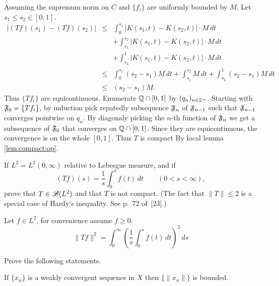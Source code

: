 \begin{enumerate}
\begin{itemize}
Assuming the supremum norm on $C$
and \(\{f_i\}\) are uniformly bounded by $M$.
Let \(s_1 \leq s_2 \in [0,1]\).
\begin{eqnarray*}
\left|(Tf)(s_1) - (Tf)(s_2)\right|
 &\leq& \int_0^{s_1}\left|K(s_1,t) - K(s_2,t)\right|\cdot M\,dt \\
 &    & + \int_{s_1}^{s_2} \left|K(s_1,t) - K(s_2,t)\right|\cdot M\,dt \\
 &    & + \int_{s_2}^1 \left|K(s_1,t) - K(s_2,t)\right|\cdot M\,dt \\
 &\leq& \int_0^{s_1}(s_2 - s_1) M\,dt
         + \int_{s_1}^{s_2}  M\,dt 
         + \int_{s_2}^1 (s_2 - s_1) M\,dt \\
 &\leq& (s_2 - s_1) M.
\end{eqnarray*}
Thus \(\{Tf_i\}\) are equicontinuous.
Enumerate \(\mathbb{Q}\cap[0,1]\) by \((q_n)_{n\in\mathbb{Z}^+}\).
Starting with  \(\frak{F}_0=\{Tf_i\}\),
by induction pick repatedly subsequence \(\frak{F}_n\)
of \(\frak{F}_{n-1}\) such that  \(\frak{F}_{n-1}\) converges
pointwise on \(q_n\).
By diagonaly picking the $n$-th function of \(\frak{F}_n\)
we get a subsequence of \(\frak{F}_0\) that converges
on \(\mathbb{Q}\cap[0,1]\). Since they are equicontinuous, the convergence
is on the whole \([0,1]\).
Thus $T$ is compact By local lemma \ref{lem:compact:op}.
\end{itemize}

\begin{excopy}
If \(L^2 = L^2(0,\infty)\) relative to Lebesgue measure, and if
\begin{equation*}
(Tf)(s) = \frac{1}{s} \int_0^s f(t)\,dt \qquad (0 < s < \infty),
\end{equation*}
prove that \(T \in \mathscr{B}(L^2)\) and that $T$ is not compact.
 (The fact that \(\|T\| \leq 2\) is a special case
of  Hardy`s inequality. See p.~72 of~[23].)
\end{excopy}

Let \(f\in L^2\), for convenience assume \(f\geq 0\).
\begin{equation*}
\|T f\|^2 = \int_0^\infty \left( \frac{1}{s} \int_0^s f(t)\,dt\right)^2\,ds
\end{equation*}

\unfinished

\begin{excopy}
Prove the following statements.

\begin{itemize}

If \(\{x_n\}\) is a weakly convergent sequence in $X$ then \(\{\|x_n\|\}\)
 is bounded.


\end{itemize}
\end{excopy}
\end{enumerate}
